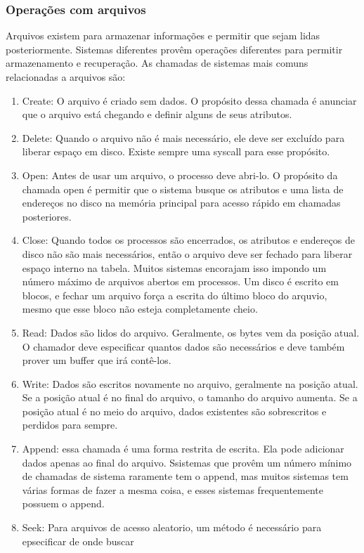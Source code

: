 \documentclass[10pt]{article}
\begin{document}
\subsubsection{Operações com arquivos}
Arquivos existem para armazenar informações e permitir que sejam lidas posteriormente. Sistemas 
diferentes provêm operações diferentes para permitir armazenamento e recuperação. As chamadas
de sistemas mais comuns relacionadas a arquivos são:
\begin{enumerate}
    \item Create: O arquivo é criado sem dados. O propósito dessa chamada é anunciar que o arquivo
    está chegando e definir alguns de seus atributos.
    \item Delete: Quando o arquivo não é mais necessário, ele deve ser excluído para liberar
    espaço em disco. Existe sempre uma syscall para esse propósito.
    \item Open: Antes de usar um arquivo, o processo deve abri-lo. O propósito da chamada open
    é permitir que o sistema busque os atributos e uma lista de endereços no disco na memória
    principal para acesso rápido em chamadas posteriores.
    \item Close: Quando todos os processos são encerrados, os atributos e endereços de disco
    não são mais necessários, então o arquivo deve ser fechado para liberar espaço interno na 
    tabela. Muitos sistemas encorajam isso impondo um número máximo de arquivos abertos em
    processos. Um disco é escrito em blocos, e fechar um arquivo força a escrita do último bloco
    do arquvio, mesmo que esse bloco não esteja completamente cheio.
    \item Read: Dados são lidos do arquivo. Geralmente, os bytes vem da posição atual. O chamador
    deve especificar quantos dados são necessários e deve também prover um buffer que irá contê-los.
    \item Write: Dados são escritos novamente no arquivo, geralmente na posição atual. Se a posição atual
    é no final do arquivo, o tamanho do arquivo aumenta. Se a posição atual é no meio do arquivo, dados
    existentes são sobrescritos e perdidos para sempre.
    \item Append: essa chamada é uma forma restrita de escrita. Ela pode adicionar dados apenas ao final
    do arquivo. Ssistemas que provêm um número mínimo de chamadas de sistema raramente tem o append, mas
    muitos sistemas tem várias formas de fazer a mesma coisa, e esses sistemas frequentemente possuem o
    append.
    \item Seek: Para arquivos de acesso aleatorio, um método é necessário para epsecificar de onde buscar

\end{enumerate}
\end{document}
